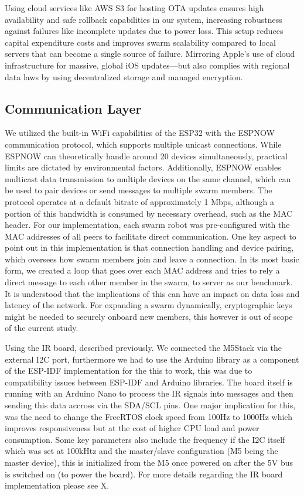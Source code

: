 \documentclass[conference]{IEEEtran}
\begin{document}
Using cloud services like AWS S3 for hosting OTA updates ensures high availability and safe rollback capabilities in our system, increasing robustness against failures like incomplete updates due to power loss. This setup reduces capital expenditure costs and improves swarm scalability compared to local servers that can become a single source of failure. Mirroring Apple’s use of cloud infrastructure for massive, global iOS updates—but also complies with regional data laws by using decentralized storage and managed encryption.


\subsection{Communication Layer}

We utilized the built-in WiFi capabilities of the ESP32 with the ESPNOW communication protocol, which supports multiple unicast connections. While ESPNOW can theoretically handle around 20 devices simultaneously, practical limits are dictated by environmental factors. Additionally, ESPNOW enables multicast data transmission to multiple devices on the same channel, which can be used to pair devices or send messages to multiple swarm members. The protocol operates at a default bitrate of approximately 1 Mbps, although a portion of this bandwidth is consumed by necessary overhead, such as the MAC header. For our implementation, each swarm robot was pre-configured with the MAC addresses of all peers to facilitate direct communication. %
One key aspect to point out in this implementation is that connection handling and device pairing, which oversees how swarm members join and leave a connection. In its most basic form, we created a loop that goes over each MAC address and tries to rely a direct message to each other member in the swarm, to server as our benchmark. It is understood that the implications of this can have an impact on data loss and latency of the network.
For expanding a swarm dynamically, cryptographic keys might be needed to securely onboard new members, this however is out of scope of the current study.

Using the IR board, described previously. We connected the M5Stack via the external I2C port, furthermore we had to use the Arduino library as a component of the ESP-IDF implementation for the this to work, this was due to compatibility issues between ESP-IDF and Arduino libraries. The board itself is running with an Arduino Nano to process the IR signals into messages and then sending this data accross via the SDA/SCL pins. One major implication for this, was the need to change the FreeRTOS clock speed from 100Hz to 1000Hz which improves responsiveness but at the cost of higher CPU load and power consumption. Some key parameters also include the frequency if the I2C itself which was set at 100kHtz and the master/slave configuration (M5 being the master device), this is initialized from the M5 once powered on after the 5V bus is switched on (to power the board). For more details regarding the IR board implementation please see X. 
\end{document}
